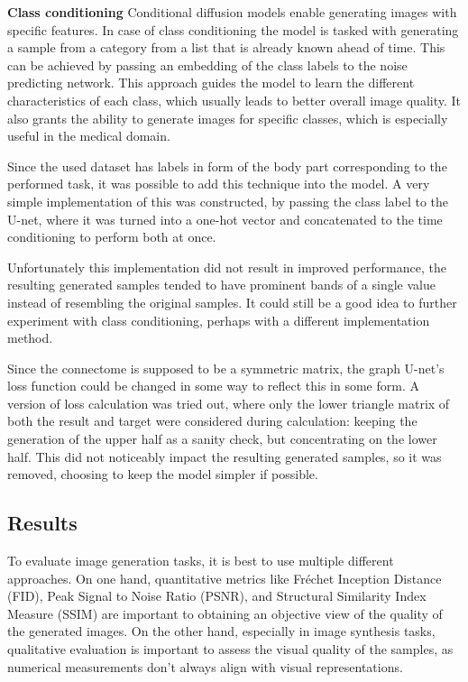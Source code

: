 	
	
	\textbf{Class conditioning} Conditional diffusion models enable generating images with specific features. In case of class conditioning the model is tasked with generating a sample from a category from a list that is already known ahead of time. This can be achieved by passing an embedding of the class labels to the noise predicting network. This approach guides the model to learn the different characteristics of each class, which usually leads to better overall image quality. It also grants the ability to generate images for specific classes, which is especially useful in the medical domain.
	
	Since the used dataset has labels in form of the body part corresponding to the performed task, it was possible to add this technique into the model. A very simple implementation of this was constructed, by passing the class label to the U-net, where it was turned into a one-hot vector and concatenated to the time conditioning to perform both at once.
	
	Unfortunately this implementation did not result in improved performance, the resulting generated samples tended to have prominent bands of a single value instead of resembling the original samples. It could still be a good idea to further experiment with class conditioning, perhaps with a different implementation method. 
	
	Since the connectome is supposed to be a symmetric matrix, the graph U-net’s loss function could be changed in some way to reflect this in some form. A version of loss calculation was tried out, where only the lower triangle matrix of both the result and target were considered during calculation: keeping the generation of the upper half as a sanity check, but concentrating on the lower half. This did not noticeably impact the resulting generated samples, so it was removed, choosing to keep the model simpler if possible.
	
	\subsection{Results}
	
	To evaluate image generation tasks, it is best to use multiple different approaches. On one hand, quantitative metrics like Fréchet Inception Distance\cite{heusel2017gans} (FID), Peak Signal to Noise Ratio\cite{hore2010image} (PSNR), and Structural Similarity Index Measure\cite{hore2010image} (SSIM) are important to obtaining an objective view of the quality of the generated images. On the other hand, especially in image synthesis tasks, qualitative evaluation is important to assess the visual quality of the samples, as numerical measurements don’t always align with visual representations.
	
